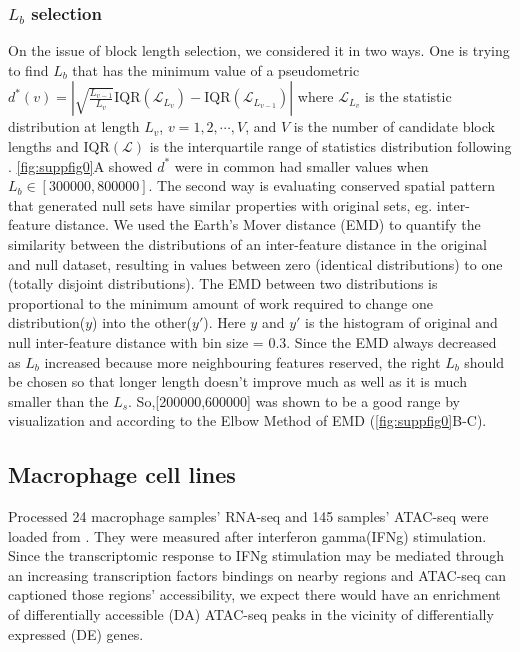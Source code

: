 \documentclass{article}
\begin{document}
\subsubsection{$L_b$ selection}\label{sec:length}
On the issue of 
block length selection, we considered it in two ways. One is trying to find $L_b$ that has the minimum value of a pseudometric $d^*(v)=|\sqrt{\frac{L_{v-1}}{L_v}}\text{IQR}(\mathcal{L}_{L_v})-\text{IQR}(\mathcal{L}_{L_{v-1}})|$ where $\mathcal{L}_{L_v}$ is the statistic distribution at length $L_v$, $v=1,2,\cdots,V$, and $V$ is the number of candidate block lengths and $\text{IQR}(\mathcal{L})$ is the interquartile range of statistics distribution following \citet{bickel2010subsampling}. \cref{fig:suppfig0}A showed $d^*$ were in common had smaller values when $L_b\in[300000,800000]$. The second way is evaluating conserved spatial pattern that generated null sets have similar properties with original sets, eg. inter-feature distance. We used the Earth's Mover distance (EMD) to quantify the similarity between the distributions of an inter-feature distance in the original  and  null  dataset,  resulting  in  values  between  zero  (identical  distributions)  to  one  (totally  disjoint  distributions). The EMD between two distributions is proportional to the minimum amount of work required to change one distribution($y$) into the other($y'$). Here $y$ and $y'$ is the histogram of original and null inter-feature distance with bin size = 0.3. Since the EMD always decreased as $L_b$ increased because more neighbouring features reserved, the right $L_b$ should be chosen so that longer length doesn’t improve much as well as it is much smaller than the $L_s$. So,[200000,600000] was shown to be  a good range by visualization and according to the Elbow Method of EMD (\cref{fig:suppfig0}B-C). 


\subsection{Macrophage cell lines}\label{sec:splines}
Processed 24 macrophage samples' RNA-seq  and 145 samples' ATAC-seq were loaded from \citep{lee2020fluent}. They were measured after interferon gamma(IFNg) stimulation. Since the transcriptomic response to IFNg stimulation may be mediated through an increasing transcription factors bindings on nearby regions and ATAC-seq can captioned those regions' accessibility, we expect there would have an enrichment of differentially accessible (DA) ATAC-seq peaks in the vicinity of differentially expressed (DE) genes. 
\end{document}

